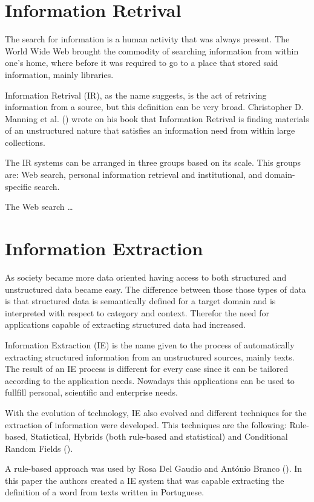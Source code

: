 \section{Information Retrival}

The search for information is a human activity that was always present.
The World Wide Web brought the commodity of searching information from within one's home, where before it was required to go to a place that stored said information, mainly libraries.

Information Retrival (IR), as the name suggests, is the act of retriving information from a source, but this definition can be very broad.
Christopher D. Manning et al. (\citeyear{manning_2008}) wrote on his book that Information Retrival is finding materials of an unstructured nature that satisfies an information need from within large collections.

The IR systems can be arranged in three groups based on its scale.
This groups are: Web search, personal information retrieval and institutional, and domain-specific search.

The Web search \dots

\section{Information Extraction}

As society became more data oriented having access to both structured and unstructured data became easy.
The difference between those those types of data is that structured data is semantically defined for a target domain and is interpreted with respect to category and context.
Therefor the need for applications capable of extracting structured data had increased.

Information Extraction (IE) is the name given to the process of automatically extracting structured information from an unstructured sources, mainly texts.
The result of an IE process is different for every case since it can be tailored according to the application needs.
Nowadays this applications can be used to fullfill personal, scientific and enterprise needs.

With the evolution of technology, IE also evolved and different techniques for the extraction of information were developed.
This techniques are the following: Rule-based, Statictical, Hybrids (both rule-based and statistical) and Conditional Random Fields (\cite{sarawagi_2008}).

A rule-based approach was used by Rosa Del Gaudio and António Branco (\citeyear{gaudio_2007}).
In this paper the authors created a IE system that was capable extracting the definition of a word from texts written in Portuguese.

